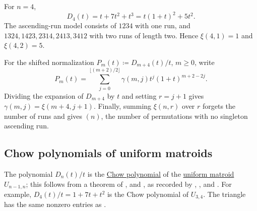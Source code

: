 For $n=4$,
\[
 D_4(t)=t+7t^2+t^3=t(1+t)^2+5t^2.
\]
The ascending-run model consists of $1234$ with one run, and
$1324,1423,2314,2413,3412$ with two runs of length two.
Hence $\xi(4,1)=1$ and $\xi(4,2)=5$.

For the shifted normalization $P_m(t)\coloneqq D_{m+4}(t)/t$, $m\geq0$,
write
\[
 P_m(t)=\sum_{j=0}^{\lfloor(m+2)/2\rfloor}
 \gamma(m,j)t^j(1+t)^{m+2-2j}.
\]
Dividing the expansion of $D_{m+4}$ by $t$ and setting $r=j+1$ gives
$\gamma(m,j)=\xi(m+4,j+1)$.
Finally, summing $\xi(n,r)$ over $r$ forgets the number of runs and gives
$(n)$, the number of permutations with no singleton ascending run.

\subsection[oeisA046739Chow]{Chow polynomials of uniform matroids}

The polynomial $D_n(t)/t$ is the
\hyperref[chowPolynomialDefinition]{Chow polynomial} of the
\hyperref[uniformMatroid]{uniform matroid} $U_{n-1,n}$; this follows from
a theorem of ,  and ,
as recorded by , ,
 and 
\cite[Sec.~1.3]{FerroniMatherneStevensVecchi2022x}.  For example,
$D_4(t)/t=1+7t+t^2$ is the Chow polynomial of $U_{3,4}$.  The triangle
 has the same nonzero entries as .
